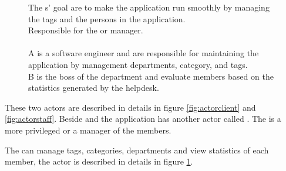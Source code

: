 \begin{figure}[h]
\begin{sadlistar}{\admin[c]}
 The \admin[]s' goal are to make the application run smoothly by managing the tags and the persons in the application. \\
 Responsible for the \hdesk[] or \astaff[] manager. \\
\\ \admin[c] A is a software engineer and are responsible for maintaining the application by management departments, category, and tags. \\
\admin[c] B is the boss of the department and evaluate \astaff[] members based on the statistics generated by the helpdesk.
 \end{sadlistar}
 \caption{}
 \label{fig:actoradmin}
 \end{figure}


These two actors are described in details in figure \ref{fig:actorclient} and \ref{fig:actorstaff}. 
Beside \astaff{} and \aclient{} the application has another actor called \sadmin{}. 
The \sadmin{} is a more privileged \astaff{} or a manager of the \astaff[] members. 

The \sadmin{} can manage tags, categories, departments and view statistics of each \astaff [] member, the actor \admin[] is described in details in figure \ref{fig:actoradmin}.
